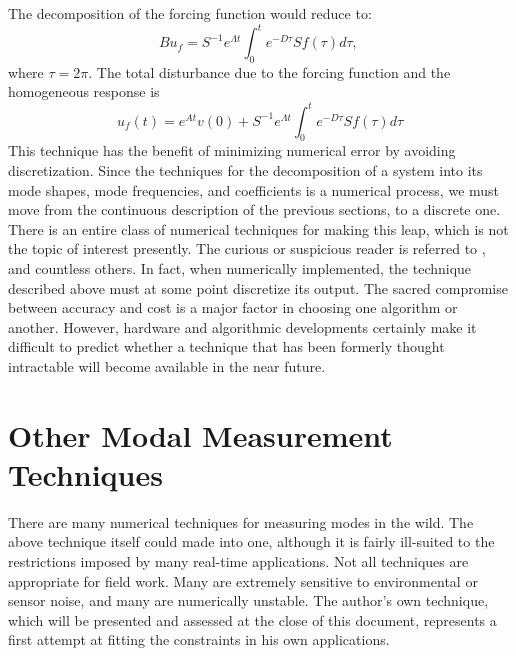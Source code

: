 \documentclass[a4paper,10pt]{report}
\numberwithin{equation}{section}
\begin{document}
The decomposition of the forcing function would reduce to:
\begin{equation}
Bu_f = S^{-1} e^{\Lambda t} \int_0^t e^{-D \tau} S f(\tau) d\tau \text{, }
\end{equation}
where $\tau = 2\pi$. The total disturbance due to the forcing function and the homogeneous response is
\begin{equation}\label{residual_regress}
u_f(t) = e^{At}v(0) + S^{-1}e^{\Lambda t} \int_0^t e^{-D \tau} S f(\tau) d\tau
\end{equation}
This technique has the benefit of minimizing numerical error by avoiding discretization. Since the techniques for the decomposition of a system into its mode shapes, mode frequencies, and coefficients is a numerical process, we must move from the continuous description of the previous sections, to a discrete one. There is an entire class of numerical techniques for making this leap, which is not the topic of interest presently. The curious or suspicious reader is referred to \cite[p.~317]{Strang2009} \cite{Press1988} \cite{Reid1992} \cite{Courant1937}, and countless others. In fact, when numerically implemented, the technique described above must at some point discretize its output. The sacred compromise between accuracy and cost is a major factor in choosing one algorithm or another. However, hardware and algorithmic developments certainly make it difficult to predict whether a technique that has been formerly thought intractable will become available in the near future. 

\section{Other Modal Measurement Techniques}\label{sec:modes_other}

There are many numerical techniques for measuring modes in the wild. The above technique itself could made into one, although it is fairly ill-suited to the restrictions imposed by many real-time applications. Not all techniques are appropriate for field work. Many are extremely sensitive to environmental or sensor noise, and many are numerically unstable. The author's own technique, which will be presented and assessed at the close of this document, represents a first attempt at fitting the constraints in his own applications. 
\end{document}
